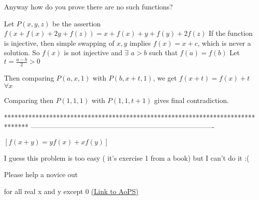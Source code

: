 


\begin{solution}
	\begin{tcolorbox}Anyway how do you prove there are no such functions?\end{tcolorbox}
Let $P(x,y,z)$ be the assertion $f(x+f(x)+2y+f(z))=x+f(x)+y+f(y)+2f(z)$
If the function is injective, then simple swapping of $x,y$ implies $f(x)=x+c$, which is never a solution.
So $f(x)$ is not injective and $\exists$ $a>b$ such that $f(a)=f(b)$
Let $t=\frac{a-b}2>0$

Then comparing $P(a,x,1)$ with $P(b,x+t,1)$, we get $f(x+t)=f(x)+t$ $\forall x$

Comparing then $P(1,1,1)$ with $P(1,1,t+1)$ gives final contradiction.
\end{solution}
*******************************************************************************
-------------------------------------------------------------------------------

\begin{problem}
	$[f (x+y) = yf(x) + xf(y)]$

I guess this problem is too easy ( it's exercise 1 from a book) but I can't do it :(

Please help a novice out

for all real x and y except 0
	\flushright \href{https://artofproblemsolving.com/community/c6h1576541}{(Link to AoPS)}
\end{problem}



